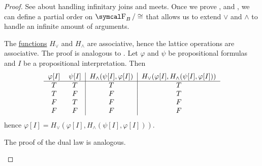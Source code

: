 \begin{proof}
  See  about handling infinitary joins and meets. Once we prove ,  and , we can define a partial order on \( \CF_B / \cong \) that allows us to extend \( \vee \) and \( \wedge \) to handle an infinite amount of arguments.

  \begin{description}
     The \hyperref[def:truth_functions]{functions} \( H_\vee \) and \( H_\wedge \) are associative, hence the lattice operations are associative.
     The proof is analogous to .
     Let \( \varphi \) and \( \psi \) be propositional formulas and \( I \) be a propositional interpretation. Then
    \begin{equation*}
      \begin{tabular}{c c | c | c}
        \( \varphi[I] \) & \( \psi[I] \) & \( H_\wedge(\psi[I], \varphi[I]) \) & \( H_\vee(\varphi[I], H_\wedge(\psi[I], \varphi[I])) \) \\
        \hline
        \( T \)          & \( T \)       & \( T \)                            & \( T \)    \\
        \( T \)          & \( F \)       & \( F \)                            & \( T \)    \\
        \( F \)          & \( T \)       & \( F \)                            & \( F \)    \\
        \( F \)          & \( F \)       & \( F \)                            & \( F \)
      \end{tabular}
    \end{equation*}
    hence \( \varphi[I] = H_\vee(\varphi[I], H_\wedge(\psi[I], \varphi[I])) \).

    The proof of the dual law is analogous.


\end{description}
\end{proof}
